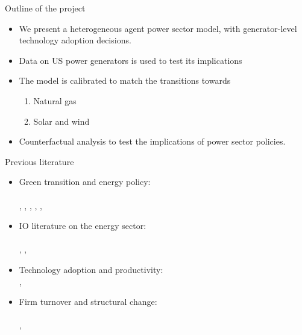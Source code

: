 \documentclass{beamer}
\begin{document}
\begin{frame}{Outline of the project}

\begin{itemize}
    \item We present a heterogeneous agent power sector model, with generator-level technology adoption decisions.
    \item Data on US power generators is used to test its implications
    \item The model is calibrated to match the transitions towards
    \begin{enumerate}
        \item Natural gas
        \item Solar and wind
    \end{enumerate}
    \item Counterfactual analysis to test the implications of power sector policies.
\end{itemize}

    
\end{frame}
\begin{frame}{Previous literature}
\small
\begin{itemize}
        \item Green transition and energy policy:\\\\ \cite{NBERw31615}, \cite{gentile}, \cite{shapiro2018pollution}, \cite{10.1257/aer.102.1.131}, \cite{NBERw18456}, \cite{NBERw31657}
        \item IO literature on the energy sector:\\\\ \cite{cff33ae3-b2ce-366e-bebc-18cca840e11c}, \cite{10.1257/aer.20172034}, \cite{Mackay}
        \item Technology adoption and productivity: \\ \cite{b541c6d5-0739-3bb5-b854-210c9c94396d}, \cite{benhabib}
        \item Firm turnover and structural change:\\\\ \cite{hopenhayn}, \cite{luttmer_selection_2007}
\end{itemize}

    
\end{frame}
\end{document}
